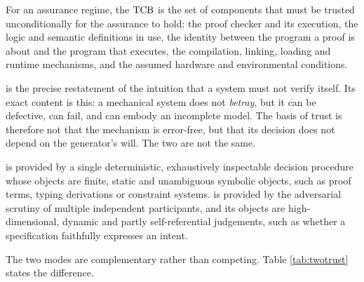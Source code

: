 \begin{definition}\label{def:tcb}
For an assurance regime, the  $\mathrm{TCB}$ is the set of components
that must be trusted unconditionally for the assurance to hold: the proof checker and its
execution, the logic and semantic definitions in use, the identity between the program a
proof is about and the program that executes, the compilation, linking, loading and
runtime mechanisms, and the assumed hardware and environmental conditions.
\end{definition}

 is the precise restatement of the intuition that a system must not
verify itself. Its exact content is this: a mechanical system does not \emph{betray}, but
it can be defective, can fail, and can embody an incomplete model. The basis of trust is
therefore not that the mechanism is error-free, but that its decision does not depend on
the generator's will. The two are not the same.

\begin{definition}\label{def:twotrust}
 is provided by a single deterministic, exhaustively inspectable
decision procedure whose objects are finite, static and unambiguous symbolic objects, such
as proof terms, typing derivations or constraint systems.  is
provided by the adversarial scrutiny of multiple independent participants, and its objects
are high-dimensional, dynamic and partly self-referential judgements, such as whether a
specification faithfully expresses an intent.
\end{definition}

The two modes are complementary rather than competing. Table \ref{tab:twotrust} states the
difference.

